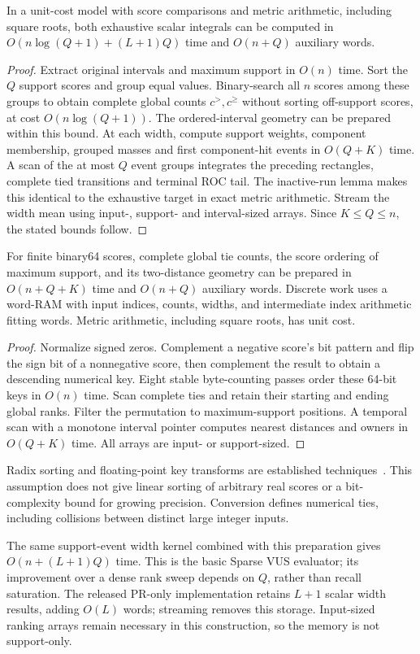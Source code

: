 \begin{theorem}
\label{thm:support-events}
In a unit-cost model with score comparisons and metric arithmetic, including
square roots, both exhaustive scalar integrals can be computed in
$O(n\log(Q+1)+(L+1)Q)$ time and $O(n+Q)$ auxiliary words.
\end{theorem}
\begin{proof}
Extract original intervals and maximum support in $O(n)$ time. Sort the $Q$
support scores and group equal values. Binary-search all $n$ scores among
these groups to obtain complete global counts $c^>,c^\ge$ without sorting
off-support scores, at cost $O(n\log(Q+1))$. The ordered-interval geometry
can be prepared within this bound. At each width, compute support weights,
component membership, grouped masses and first component-hit events in
$O(Q+K)$ time. A scan of the at most $Q$ event groups integrates the
preceding rectangles, complete tied transitions and terminal ROC tail.
The inactive-run lemma makes this identical to the exhaustive target in
exact metric arithmetic. Stream the width mean using input-, support- and
interval-sized arrays. Since $K\le Q\le n$, the stated bounds follow.
\end{proof}

\begin{proposition}
\label{prop:radix}
For finite binary64 scores, complete global tie counts, the score ordering
of maximum support, and its two-distance geometry can be prepared in
$O(n+Q+K)$ time and $O(n+Q)$ auxiliary words. Discrete work uses a word-RAM
with input indices, counts, widths, and intermediate index arithmetic
fitting words. Metric arithmetic, including square roots, has unit cost.
\end{proposition}
\begin{proof}
Normalize signed zeros. Complement a negative score's bit pattern and flip
the sign bit of a nonnegative score, then complement the result to obtain a
descending numerical key. Eight stable byte-counting passes order these
64-bit keys in $O(n)$ time. Scan complete ties and retain their starting and
ending global ranks. Filter the permutation to maximum-support positions.
A temporal scan with a monotone interval pointer computes nearest distances
and owners in $O(Q+K)$ time. All arrays are input- or support-sized.
\end{proof}
Radix sorting and floating-point key transforms are established
techniques~\cite{demaine2011radix,herf2001radix}. This assumption does not give
linear sorting of arbitrary real scores or a bit-complexity bound for growing
precision. Conversion defines numerical ties, including collisions between
distinct large integer inputs.

The same support-event width kernel combined with this preparation gives
$O(n+(L+1)Q)$ time. This is the basic Sparse VUS evaluator; its improvement
over a dense rank sweep depends on $Q$, rather than recall saturation.
The released PR-only implementation retains $L+1$ scalar width results,
adding $O(L)$ words; streaming removes this storage. Input-sized ranking
arrays remain necessary in this construction, so the memory is not
support-only.
